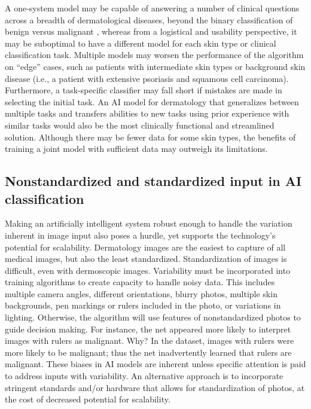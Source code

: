 A one-system model may be capable of answering a number of clinical questions across a breadth of dermatological diseases, beyond the binary classification of benign versus malignant \cite{kuprel2017dermatologist}, whereas from a logistical and usability perspective, it may be suboptimal to have a different model for each skin type or clinical classification task. Multiple models may worsen the performance of the algorithm on “edge” cases, such as patients with intermediate skin types or background skin disease (i.e., a patient with extensive psoriasis and squamous cell carcinoma). Furthermore, a task-specific classifier may fall short if mistakes are made in selecting the initial task. An AI model for dermatology that generalizes between multiple tasks and transfers abilities to new tasks using prior experience with similar tasks would also be the most clinically functional and streamlined solution. Although there may be fewer data for some skin types, the benefits of training a joint model with sufficient data may outweigh its limitations.

\subsection{Nonstandardized and standardized input in AI classification}
Making an artificially intelligent system robust enough to handle the variation inherent in image input also poses a hurdle, yet supports the technology’s potential for scalability. Dermatology images are the easiest to capture of all medical images, but also the least standardized. Standardization of images is difficult, even with dermoscopic images. Variability must be incorporated into training algorithms to create capacity to handle noisy data. This includes multiple camera angles, different orientations, blurry photos, multiple skin backgrounds, pen markings or rulers included in the photo, or variations in lighting. Otherwise, the algorithm will use features of nonstandardized photos to guide decision making. For instance, the net appeared more likely to interpret images with rulers as malignant. Why? In the dataset, images with rulers were more likely to be malignant; thus the net inadvertently learned that rulers are malignant. These biases in AI models are inherent unless specific attention is paid to address inputs with variability.  An alternative approach is to incorporate stringent standards and/or hardware that allows for standardization of photos, at the cost of decreased potential for scalability.

